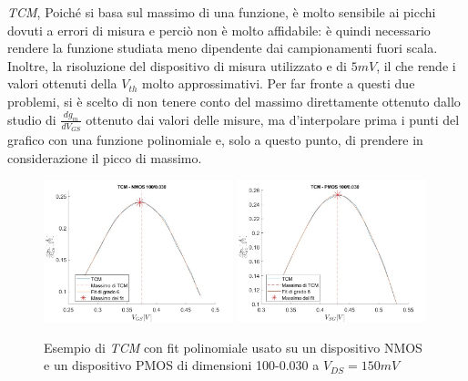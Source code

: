 \documentclass[
	a4paper,
	cleardoublepage=empty,
	headings=twolinechapter,
	numbers=autoenddot,
]{scrbook}
\begin{document}
\emph{TCM}, Poiché si basa sul massimo di una funzione, è molto sensibile ai picchi dovuti a errori di misura e perciò non è molto affidabile:
è quindi necessario rendere la funzione studiata meno dipendente dai campionamenti fuori scala. Inoltre, la risoluzione del dispositivo di misura utilizzato e di $5 mV$, il che rende i valori ottenuti della $V_{th}$ molto approssimativi.
Per far fronte a questi due problemi, si è scelto di non tenere conto del massimo direttamente ottenuto dallo studio di $\frac{dg_m}{dV_{GS}}$ ottenuto dai valori delle misure, ma d'interpolare prima i punti del grafico con una funzione polinomiale e, solo a questo punto, di prendere in considerazione il picco di massimo.

\begin{figure}[H]
  \centering
  \includegraphics[width=0.49\textwidth]{TCM-N4-100-30}
  \includegraphics[width=0.49\textwidth]{TCM-P1-100-30}
  \caption{Esempio di \emph{TCM} con fit polinomiale usato su un dispositivo NMOS e un dispositivo PMOS di dimensioni 100-0.030 a $V_{DS} = 150 mV$}
\end{figure}
\end{document}
